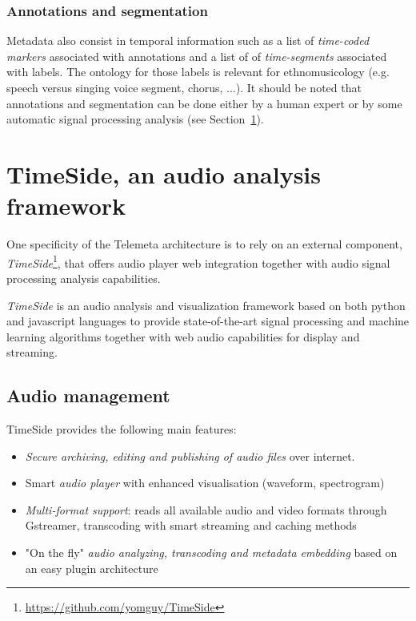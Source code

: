 \documentclass{paper}
\begin{document}
\subsubsection{Annotations and segmentation}
Metadata also consist in temporal information such as a list of \emph{time-coded markers} associated with annotations and a list of of \emph{time-segments} associated with labels. The ontology for those labels is relevant for ethnomusicology (e.g. speech versus singing voice segment, chorus, ...).
It should be noted that annotations and segmentation can be done either by a human expert or by some automatic signal processing analysis (see Section~\ref{sec:Timeside}).

\section{TimeSide, an audio analysis framework}\label{sec:Timeside}
One specificity of the Telemeta architecture is to rely on an external component, \emph{TimeSide}\footnote{\url{https://github.com/yomguy/TimeSide}}, that offers audio player web integration together with audio signal processing analysis capabilities. 

\emph{TimeSide} is an audio analysis and visualization framework based on both python and javascript languages to provide state-of-the-art signal processing and machine learning algorithms together with web audio capabilities for display and streaming.



\subsection{Audio management}
TimeSide provides the following main features:
\begin{itemize}
\item \emph{Secure archiving, editing and publishing of audio files} over
  internet.
\item Smart \emph{audio player} with enhanced visualisation (waveform, spectrogram)
\item \emph{Multi-format support}: reads all available audio and video formats  through Gstreamer, transcoding with smart streaming and caching methods%
\item "On the fly" \emph{audio analyzing, transcoding and metadata
    embedding} based on an easy plugin architecture
\end{itemize}
\end{document}
